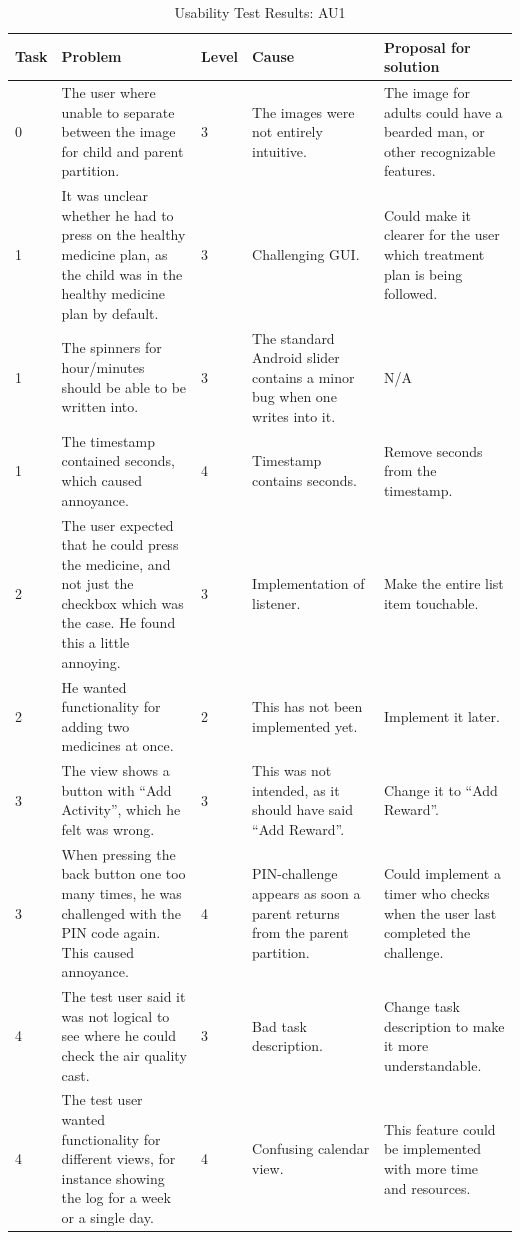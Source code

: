 \begin{singlespacing}
\begin{table}[H]
\centering
\begin{tabular}{| p{0.7cm} | p{4.0cm} | p{0.9cm} | p{3.7cm} | p{3.3cm} |}
\hline
	\textbf{Task} & \textbf{Problem} & \textbf{Level} & \textbf{Cause} & \textbf{Proposal for solution} \\
	\hline
	0 & The user where unable to separate between the image for child and parent partition. & 3 & The images were not entirely intuitive. & The image for adults could have a bearded man, or other recognizable features. \\
	\hline
	1 & It was unclear whether he had to press on the healthy medicine plan, as the child was in the healthy medicine plan by default. & 3 & Challenging GUI. & Could make it clearer for the user which treatment plan is being followed. \\
	\hline
	1 & The spinners for hour/minutes should be able to be written into. & 3 & The standard Android slider contains a minor bug when one writes into it.  & N/A \\
	\hline
	1 & The timestamp contained seconds, which caused annoyance. & 4 & Timestamp contains seconds. & Remove seconds from the timestamp. \\
	\hline
	2 & The user expected that he could press the medicine, and not just the checkbox which was the case. He found this a little annoying. & 3 & Implementation of listener. & Make the entire list item touchable. \\
	\hline
	2 & He wanted functionality for adding two medicines at once. & 2 & This has not been implemented yet. & Implement it later. \\
	\hline
	3 & The view shows a button with ``Add Activity'', which he felt was wrong. & 3 & This was not intended, as it should have said ``Add Reward''. & Change it to ``Add Reward''. \\
	\hline
	3 & When pressing the back button one too many times, he was challenged with the PIN code again. This caused annoyance. & 4 & PIN-challenge appears as soon a parent returns from the parent partition. & Could implement a timer who checks when the user last completed the challenge.\\
	\hline
	4 & The test user said it was not logical to see where he could check the air quality cast. & 3 & Bad task description. & Change task description to make it more understandable. \\
	\hline
	4 & The test user wanted functionality for different views, for instance showing the log for a week or a single day. & 4 & Confusing calendar view. & This feature could be implemented with more time and resources.  \\
	\hline
\end{tabular}
\caption{Usability Test Results: AU1}
\label{tab:testadult1}
\end{table}
\end{singlespacing}


